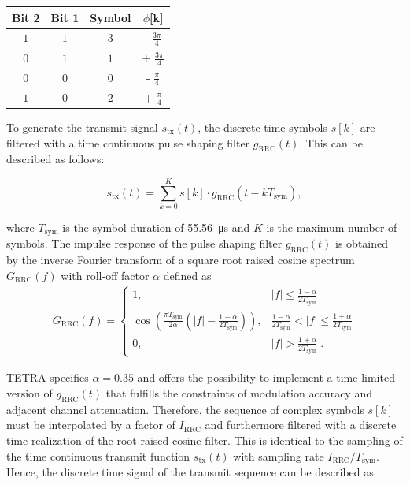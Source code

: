 \begin{table}[htb]
\label{table:phase_offset}
	\centering\begin{tabular}{cc|c|c}
	\toprule
	Bit 2	& Bit 1	& Symbol	& $\phi$[k] \\
	\midrule
	$1$	& $1$	& $3$	& - $\frac{3\pi}{4}$  \\
	$0$	& $1$	& $1$	& + $\frac{3\pi}{4}$  \\
	$0$	& $0$	& $0$	& - $\frac{\pi}{4}$  \\
	$1$	& $0$	& $2$	& + $\frac{\pi}{4}$  \\
	\bottomrule
	\end{tabular}
\end{table}

To generate the transmit signal $s_\text{tx}(t)$, the discrete time symbols $s[k]$ are filtered with a time continuous pulse shaping filter $g_{\text{RRC}}(t)$. This can be described as follows: 

\begin{equation}
		s_\text{tx}(t)=\sum_{k=0}^{K}{s[k] \cdot g_{\text{RRC}}(t-kT_\text{sym})},
\end{equation}

where $T_\text{sym}$ is the symbol duration of \SI{55.56}{\micro s} and $K$ is the maximum number of symbols. The impulse response of the pulse shaping filter $g_{\text{RRC}}(t)$ is obtained by the inverse Fourier transform of a square root raised cosine spectrum $G_{\text{RRC}}(f)$ with roll-off factor $\alpha$  defined as
\begin{align}	
G_{\text{RRC}}(f)=
\begin{cases} 
1,     & |f| \leq \frac{1-\alpha}{2T_{\text{sym}}} \\
\cos \left(\frac{\pi T_{\text{sym}}}{2 \alpha}\left( |f| - \frac{1 - \alpha}{2 T_{\text{sym}}}\right)\right), 
      & \frac{1-\alpha}{2T_{\text{sym}}} < |f| \leq \frac{1+\alpha}{2T_{\text{sym}}} \\
0,     & |f| > \frac{1+\alpha}{2T_{\text{sym}}}\;.
\end{cases}
\label{eq:g_rrc_f}
\end{align}

TETRA specifies $\alpha = 0.35$ and offers the possibility to implement a time limited version of $g_\text{RRC}(t)$ that fulfills the constraints of modulation accuracy and adjacent channel attenuation. Therefore, the sequence of  complex symbols $s[k]$ must be interpolated by a factor of $I_\text{RRC}$ and furthermore filtered with a discrete time realization of the root raised cosine filter. This is identical to the sampling of the time continuous transmit function $s_\text{tx}(t)$ with sampling rate $I_\text{RRC}/T_\text{sym}$. Hence, the discrete time signal of the transmit sequence can be described as

